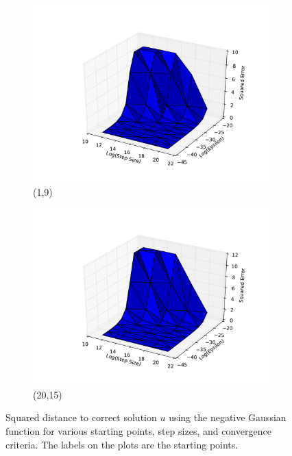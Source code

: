 \documentclass[10pt,psamsfonts]{amsart}
\theoremstyle{definition}
\theoremstyle{remark}
\numberwithin{equation}{section}
\begin{document}
\begin{figure}[b]
\begin{subfigure}[b]{0.23\textwidth}
	\includegraphics[width=\textwidth]{hw1_1-1_2.pdf}
	\caption{(1,9)}
	\end{subfigure}
	\begin{subfigure}[b]{0.23\textwidth}
		\includegraphics[width=\textwidth]{hw1_1-1_3.pdf}
		\caption{(20,15)}
		\end{subfigure}
\caption{Squared distance to correct solution $u$ using the negative Gaussian function for various starting points, step sizes, and convergence criteria. The labels on the plots are the starting points.}
\end{figure}
\end{document}
